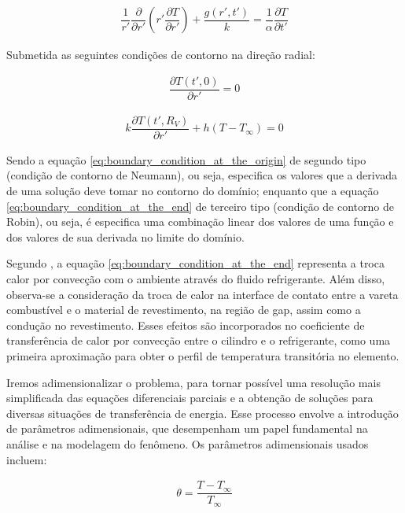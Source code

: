 \begin{gather}
    \dfrac{1}{r '} \dfrac{\partial}{\partial r '} \left( r ' \dfrac{\partial T}{\partial r '} \right) + \dfrac{g(r ', t ')}{k} = \dfrac{1}{\alpha} \dfrac{\partial T}{\partial t '}
    \label{eq:heat_equation}
\end{gather}

Submetida as seguintes condições de contorno na direção radial:

\begin{gather}
    \dfrac{\partial T (t ' , 0)}{\partial r '} = 0
    \label{eq:boundary_condition_at_the_origin}
\end{gather}

\begin{gather}
    k \dfrac{\partial T (t ' , R_V )}{\partial r '} + h \left( T - T _\infty \right) = 0
    \label{eq:boundary_condition_at_the_end}
\end{gather}

Sendo a equação \ref{eq:boundary_condition_at_the_origin} de segundo tipo (condição de contorno de Neumann), ou seja, especifica os valores que a derivada de uma solução deve tomar no contorno do domínio; enquanto que a equação \ref{eq:boundary_condition_at_the_end} de terceiro tipo (condição de contorno de Robin), ou seja, é especifica uma combinação linear dos valores de uma função e dos valores de sua derivada no limite do domínio.

Segundo \citet{soares2017}, a equação \ref{eq:boundary_condition_at_the_end} representa a troca calor por convecção com o ambiente através do fluido refrigerante. Além disso, observa-se a consideração da troca de calor na interface de contato entre a vareta combustível e o material de revestimento, na região de gap, assim como a condução no revestimento. Esses efeitos são incorporados no coeficiente de transferência de calor por convecção entre o cilindro e o refrigerante, como uma primeira aproximação para obter o perfil de temperatura transitória no elemento.

Iremos adimensionalizar o problema, para tornar possível uma resolução mais simplificada das equações diferenciais parciais e a obtenção de soluções para diversas situações de transferência de energia. Esse processo envolve a introdução de parâmetros adimensionais, que desempenham um papel fundamental na análise e na modelagem do fenômeno. Os parâmetros adimensionais usados incluem:

\begin{gather}
    \theta = \dfrac{T - T_ \infty}{T_ \infty}
\end{gather}

